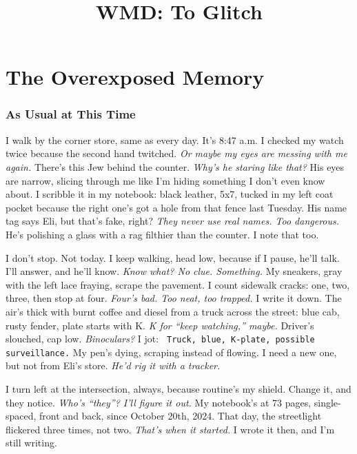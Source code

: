 \documentclass[12pt]{article} %
\title{WMD: To Glitch}
\author{}
\date{}
\newcommand{\note}[1]{\texttt{\small \color{DarkGray} #1}}
\begin{document}
\maketitle
\tableofcontents
\newpage

\part{The Overexposed Memory}

\section{As Usual at This Time}

I walk by the corner store, same as every day. It’s 8:47 a.m. I checked my watch twice because the second hand twitched. \textit{Or maybe my eyes are messing with me again.} There’s this Jew behind the counter. \textit{Why’s he staring like that?} His eyes are narrow, slicing through me like I’m hiding something I don’t even know about. I scribble it in my notebook: black leather, 5x7, tucked in my left coat pocket because the right one’s got a hole from that fence last Tuesday. His name tag says \textnormal{Eli}, but that’s fake, right? \textit{They never use real names. Too dangerous.} He’s polishing a glass with a rag filthier than the counter. I note that too.

I don’t stop. Not today. I keep walking, head low, because if I pause, he’ll talk. I’ll answer, and he’ll know. \textit{Know what? No clue. Something.} My sneakers, gray with the left lace fraying, scrape the pavement. I count sidewalk cracks: one, two, three, then stop at four. \textit{Four’s bad. Too neat, too trapped.} I write it down. The air’s thick with burnt coffee and diesel from a truck across the street: blue cab, rusty fender, plate starts with K. \textit{K for “keep watching,” maybe.} Driver’s slouched, cap low. \textit{Binoculars?} I jot: \note{Truck, blue, K-plate, possible surveillance.} My pen’s dying, scraping instead of flowing. I need a new one, but not from \textnormal{Eli}’s store. \textit{He’d rig it with a tracker.}

I turn left at the intersection, always, because routine’s my shield. Change it, and they notice. \textit{Who’s “they”? I’ll figure it out.} My notebook’s at 73 pages, single-spaced, front and back, since October 20th, 2024. That day, the streetlight flickered three times, not two. \textit{That’s when it started.} I wrote it then, and I’m still writing.
\end{document}
